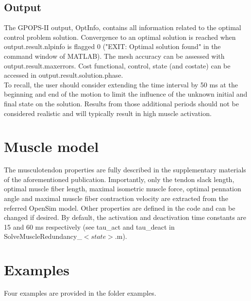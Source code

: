 \documentclass[a4paper,oneside,11pt]{article}
\begin{document}
\subsection{Output}

The GPOPS-II output, OptInfo, contains all information related to the optimal control problem solution. Convergence to an optimal solution is reached when output.result.nlpinfo is flagged 0 ("EXIT: Optimal solution found" in the command window of MATLAB). The mesh accuracy can be assessed with output.result.maxerrors. Cost functional, control, state (and costate) can be accessed in output.result.solution.phase. \\

To recall, the user should consider extending the time interval by 50 ms at the beginning and end of the motion to limit the influence of the unknown initial and final state on the solution. Results from those additional periods should not be considered realistic and will typically result in high muscle activation.

\section{Muscle model}

The musculotendon properties are fully described in the supplementary materials of the aforementioned publication. Importantly, only the tendon slack length, optimal muscle fiber length, maximal isometric muscle force, optimal pennation angle and maximal muscle fiber contraction velocity are extracted from the referred OpenSim model. Other properties are defined in the code and can be changed if desired. By default, the activation and deactivation time constants are 15 and 60 ms respectively (see tau_act and tau_deact in SolveMuscleRedundancy_$<state>$.m).

\section{Examples}

Four examples are provided in the folder examples.
\end{document}
